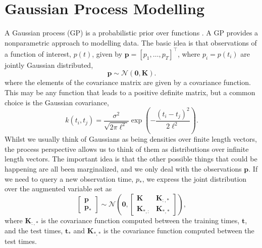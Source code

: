 \documentclass{article}
\begin{document}
\section{Gaussian Process Modelling}

A  Gaussian  process (GP)  is  a  probabilistic  prior over  functions
\cite{Rasmussen:book06}.  A GP  provides a  nonparametric  approach to
modelling data. The  basic idea is that observations  of a function of
interest,   $p(t)$,   given  by   $\mathbf{p}   =  \left[p_1,   \dots,
  p_T\right]^\top$,   where    $p_i=p(t_i)$   are   jointly   Gaussian
distributed,
\begin{equation}
  \mathbf{p} \sim \mathcal{N}(\mathbf{0}, \mathbf{K}).
\end{equation}
where the elements of the  covariance matrix are given by a covariance
function. This may  be any function that leads  to a positive definite
matrix, but a common choice is the Gaussian covariance,
\begin{equation}
  k(t_i,   t_j)   =  \frac{\sigma^2}{\sqrt{2\pi   \ell^2}}\exp\left(-\frac{(t_i
      -t_j)^2}{2\ell^2}\right).
\end{equation}
Whilst we usually  think of Gaussians as being  densities over finite
length vectors, the process perspective  allows us to think of them as
distributions over infinite length vectors. The important idea is that
the  other  possible things  that  could  be  happening are  all  been
marginalized, and we only  deal with the observations $\mathbf{p}$. If
we need to  query a new observation time, $p_*$,  we express the joint
distribution over the augmented variable set as
\begin{equation}
  \left[\begin{matrix}
      \mathbf{p}\\
      \mathbf{p}_*
    \end{matrix}\right]
  \sim \mathcal{N}\left(\mathbf{0}, \left[\begin{matrix}
        \mathbf{K} & \mathbf{K}_{:,*}\\
        \mathbf{K}_{*,:} & \mathbf{K}_{*,*}
      \end{matrix}
    \right]\right),
\end{equation}
where $\mathbf{K}_{:,*}$  is the covariance  function computed between
the training  times, $\mathbf{t}$, and the  test times, $\mathbf{t}_*$
and $\mathbf{K}_{*,*}$ is the covariance function computed between the
test times.
\end{document}

